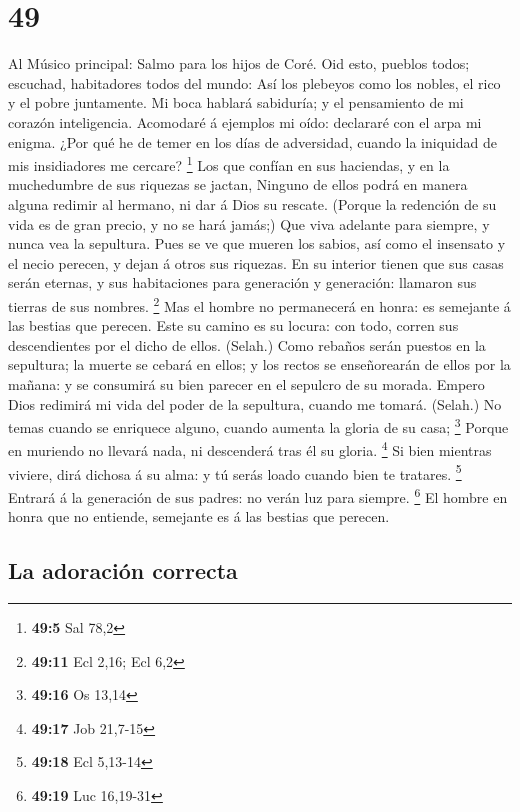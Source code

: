 \hypertarget{section-48}{%
\section{49}\label{section-48}}

 Al Músico principal: Salmo para los hijos de Coré. Oid
esto, pueblos todos; escuchad, habitadores todos del mundo: 
Así los plebeyos como los nobles, el rico y el pobre juntamente.
 Mi boca hablará sabiduría; y el pensamiento de mi corazón
inteligencia.  Acomodaré á ejemplos mi oído: declararé con
el arpa mi enigma.  ¿Por qué he de temer en los días de
adversidad, cuando la iniquidad de mis insidiadores me cercare?
\footnote{\textbf{49:5} Sal 78,2}  Los que confían en sus
haciendas, y en la muchedumbre de sus riquezas se jactan, 
Ninguno de ellos podrá en manera alguna redimir al hermano, ni dar á
Dios su rescate.  (Porque la redención de su vida es de gran
precio, y no se hará jamás;)  Que viva adelante para
siempre, y nunca vea la sepultura.  Pues se ve que mueren
los sabios, así como el insensato y el necio perecen, y dejan á otros
sus riquezas.  En su interior tienen que sus casas serán
eternas, y sus habitaciones para generación y generación: llamaron sus
tierras de sus nombres. \footnote{\textbf{49:11} Ecl 2,16; Ecl 6,2}
 Mas el hombre no permanecerá en honra: es semejante á las
bestias que perecen.  Este su camino es su locura: con
todo, corren sus descendientes por el dicho de ellos. (Selah.)
 Como rebaños serán puestos en la sepultura; la muerte se
cebará en ellos; y los rectos se enseñorearán de ellos por la mañana: y
se consumirá su bien parecer en el sepulcro de su morada. 
Empero Dios redimirá mi vida del poder de la sepultura, cuando me
tomará. (Selah.)  No temas cuando se enriquece alguno,
cuando aumenta la gloria de su casa; \footnote{\textbf{49:16} Os 13,14}
 Porque en muriendo no llevará nada, ni descenderá tras él
su gloria. \footnote{\textbf{49:17} Job 21,7-15}  Si bien
mientras viviere, dirá dichosa á su alma: y tú serás loado cuando bien
te tratares. \footnote{\textbf{49:18} Ecl 5,13-14}  Entrará
á la generación de sus padres: no verán luz para siempre. \footnote{\textbf{49:19}
  Luc 16,19-31}  El hombre en honra que no entiende,
semejante es á las bestias que perecen.

\hypertarget{la-adoraciuxf3n-correcta}{%
\subsection{La adoración correcta}\label{la-adoraciuxf3n-correcta}}

